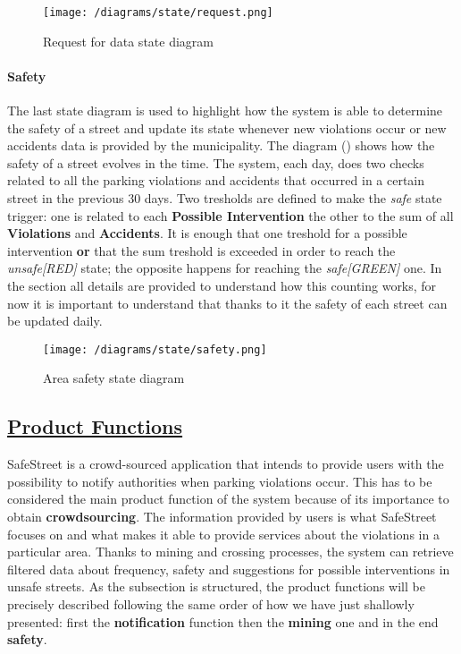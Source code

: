 			\vspace{0.3cm}
			\begin{figure}[h]
				\centering
				\texttt{[image: /diagrams/state/request.png]}
				\caption{\label{fig:requestState}Request for data state diagram}
			\end{figure}
		
		\paragraph{Safety}
			The last state diagram is used to highlight how the system is able to determine the safety of a street and update its state whenever new violations occur or new accidents data is provided by the municipality. The diagram () shows how the safety of a street evolves in the time. The system, each day, does two checks related to all the parking violations and accidents that occurred in a certain street in the previous 30 days. Two tresholds are defined to make the \textit{safe} state trigger: one is related to each \textbf{Possible Intervention} the other to the sum of all \textbf{Violations} and \textbf{Accidents}. It is enough that one treshold for a possible intervention \textbf{or} that the sum treshold is exceeded in order to reach the \textit{unsafe[RED]} state; the opposite happens for reaching the \textit{safe[GREEN]} one. In the section  all details are provided to understand how this counting works, for now it is important to understand that thanks to it the safety of each street can be updated daily.
			
			\vspace{0.3cm}
			\begin{figure}[h]
				\centering
				\texttt{[image: /diagrams/state/safety.png]}
				\caption{\label{fig:safetyState}Area safety state diagram}
			\end{figure}   

\subsection[Product Functions]{\hyperlink{toc}{Product Functions}}
	\label{sec:productFunctions}
	SafeStreet is a crowd-sourced application that intends to provide users with the possibility to notify authorities when parking violations occur. This has to be considered the main product function of the system because of its importance to obtain \textbf{crowdsourcing}. The information provided by users is what SafeStreet focuses on and what makes it able to provide services about the violations in a particular area. Thanks to mining and crossing processes, the system can retrieve filtered data about frequency, safety and suggestions for possible interventions in unsafe streets. As the subsection is structured, the product functions will be precisely described following the same order of how we have just shallowly presented: first the \textbf{notification} function then the \textbf{mining} one and in the end \textbf{safety}. \\
	
